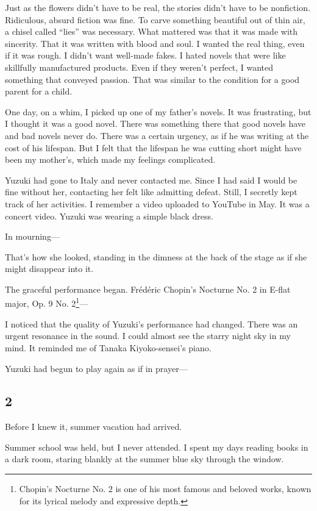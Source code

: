 \documentclass[
    a4paper,
    12pt,
    twoside,
    openany,
    UTF8,
    fontset=windows
]{ctexbook}
\begin{document}
Just as the flowers didn't have to be real, the stories didn't have to be nonfiction. Ridiculous, absurd fiction was fine. To carve something beautiful out of thin air, a chisel called ``lies'' was necessary. What mattered was that it was made with sincerity. That it was written with blood and soul. I wanted the real thing, even if it was rough. I didn't want well-made fakes. I hated novels that were like skillfully manufactured products. Even if they weren't perfect, I wanted something that conveyed passion. That was similar to the condition for a good parent for a child.

One day, on a whim, I picked up one of my father's novels. It was frustrating, but I thought it was a good novel. There was something there that good novels have and bad novels never do. There was a certain urgency, as if he was writing at the cost of his lifespan. But I felt that the lifespan he was cutting short might have been my mother's, which made my feelings complicated.

Yuzuki had gone to Italy and never contacted me. Since I had said I would be fine without her, contacting her felt like admitting defeat. Still, I secretly kept track of her activities. I remember a video uploaded to YouTube in May. It was a concert video. Yuzuki was wearing a simple black dress.

In mourning---

That's how she looked, standing in the dimness at the back of the stage as if she might disappear into it.

The graceful performance began. Frédéric Chopin's Nocturne No. 2 in E-flat major, Op. 9 No. 2\footnote{Chopin's Nocturne No. 2 is one of his most famous and beloved works, known for its lyrical melody and expressive depth.}---

I noticed that the quality of Yuzuki's performance had changed. There was an urgent resonance in the sound. I could almost see the starry night sky in my mind. It reminded me of Tanaka Kiyoko-sensei's piano.

Yuzuki had begun to play again as if in prayer---


\subsection*{2}

Before I knew it, summer vacation had arrived.

Summer school was held, but I never attended. I spent my days reading books in a dark room, staring blankly at the summer blue sky through the window.
\end{document}
